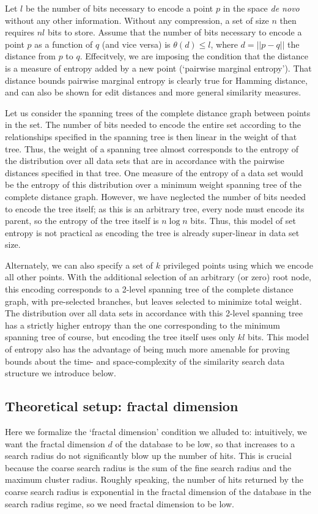 \documentclass{amsbook}
\theoremstyle{definition}
\theoremstyle{remark}
\numberwithin{equation}{section}
\begin{document}
Let $l$ be the number of bits necessary to encode a point $p$ in the space \textit{de novo} without any other information.
Without any compression, a set of size $n$ then requires $nl$ bits to store.
Assume that the number of bits necessary to encode a point $p$ as a function of $q$ (and vice versa) is $\theta(d) \le l$, where $d = ||p -q||$ the distance from $p$ to $q$.
Effecitvely, we are imposing the condition that the distance is a measure of entropy added by a new point (`pairwise marginal entropy').
That distance bounds pairwise marginal entropy is clearly true for Hamming distance, and can also be shown for edit distances and more general similarity measures.

Let us consider the spanning trees of the complete distance graph between points in the set.
The number of bits needed to encode the entire set according to the relationships specified in the spanning tree is then linear in the weight of that tree.
Thus, the weight of a spanning tree almost corresponds to the entropy of the distribution over all data sets that are in accordance with the pairwise distances specified in that tree.
One measure of the entropy of a data set would be the entropy of this distribution over a minimum weight spanning tree of the complete distance graph.
However, we have neglected the number of bits needed to encode the tree itself; as this is an arbitrary tree, every node must encode its parent, so the entropy of the tree itself is $n \log n$ bits.
Thus, this model of set entropy is not practical as encoding the tree is already super-linear in data set size.

Alternately, we can also specify a set of $k$ privileged points using which we encode all other points.
With the additional selection of an arbitrary (or zero) root node, this encoding corresponds to a 2-level spanning tree of the complete distance graph, with pre-selected branches, but leaves selected to minimize total weight.
The distribution over all data sets in accordance with this 2-level spanning tree has a strictly higher entropy than the one corresponding to the minimum spanning tree of course, but encoding the tree itself uses only $kl$ bits.
This model of entropy also has the advantage of being much more amenable for proving bounds about the time- and space-complexity of the similarity search data structure we introduce below.

\subsection{Theoretical setup: fractal dimension}
Here we formalize the `fractal dimension' condition we alluded to: intuitively, we want the fractal dimension $d$ of the database to be low, so that increases to a search radius do not significantly blow up the number of hits.
This is crucial because the coarse search radius is the sum of the fine search radius and the maximum cluster radius.
Roughly speaking, the number of hits returned by the coarse search radius is exponential in the fractal dimension of the database in the search radius regime, so we need fractal dimension to be low.
\end{document}
